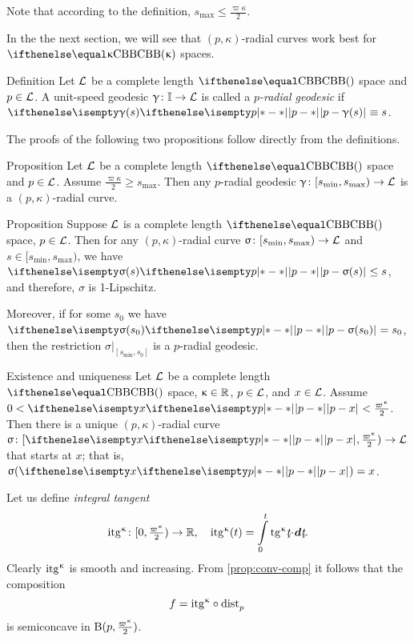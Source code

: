 Note that according to the definition, $s_{\max}\le\tfrac{\varpi\kappa}2$.

In the the next section, we will see that  $(p,\kappa)$-radial curves 
work best for $\Alex\kappa$ spaces.



\begin{thm}{Definition}\label{def:rad-geod}
Let $\mathcal{L}$ be a complete length $\Alex{}$ space
and $p\in\spc{L}$.
A unit-speed geodesic  $\gamma\:\II\to \spc{L}$  is called a
\emph{$p$-radial geodesic} if 
$\dist{p}{\gamma(s)}{}\equiv s$.
\end{thm}

The proofs of the following two propositions follow directly from the definitions. 

\begin{thm}{Proposition}\label{prop:rad-geod}
Let $\mathcal{L}$ be a complete length $\Alex{}$ space
and $p\in\spc{L}$.
Assume $\tfrac{\varpi\kappa}{2}
\ge 
s_{\max}$.
Then any $p$-radial geodesic 
$\gamma\:[s_{\min},s_{\max})
\to 
\spc{L}$ 
is a $(p,\kappa)$-radial curve.
\end{thm}

\begin{thm}{Proposition}\label{prop:dist<s}
Suppose $\mathcal{L}$ is a complete length $\Alex{}$ space, 
$p\in\spc{L}$.
Then for any $(p,\kappa)$-radial curve $\sigma\:[s_{\min},s_{\max})\to \spc{L}$ and $s\in [s_{\min},s_{\max})$, 
we have $\dist{p}{\sigma(s)}{}\le s$,
and therefore, $\sigma$ is 1-Lipschitz.

Moreover, 
if for some $s_0$ we have $\dist{p}{\sigma(s_0)}{}= s_0$, 
then the restriction $\sigma|_{[s_{\min},s_0]}$ is a $p$-radial geodesic.
\end{thm}

\begin{thm}{Existence and uniqueness}\label{rad-curv-exist}
Let $\mathcal{L}$ be a complete length $\Alex{}$ space, 
$\kappa\in\RR$, 
$p\in\spc{L}$, 
and $x\in \spc{L}$.
Assume
$0
<
\dist{p}{x}{}
<
\tfrac{\varpi\kappa}2$.
Then there is a unique $(p,\kappa)$-radial curve $\sigma\:[\dist{p}{x}{},\tfrac{\varpi\kappa}2)\to \spc{L}$ 
that starts at $x$;
that is, $\sigma(\dist{p}{x}{})=x$.
\end{thm}


Let us define \emph{integral tangent}  
\[\itg\kappa\:[0,\tfrac{\varpi\kappa}2)\to\RR,
\quad 
\itg\kappa (t)=\int\limits_0^t\tang\kappa\under t\cdot\dd\under t.\]
Clearly $\mathrm{itg}^{\upkappa}$ is smooth and increasing.
From \ref{prop:conv-comp} it follows that the composition 
\[f=\itg\kappa\circ\distfun{p}{}{}\] 
is semiconcave in $\oBall(p,\tfrac{\varpi\kappa}2)$.


